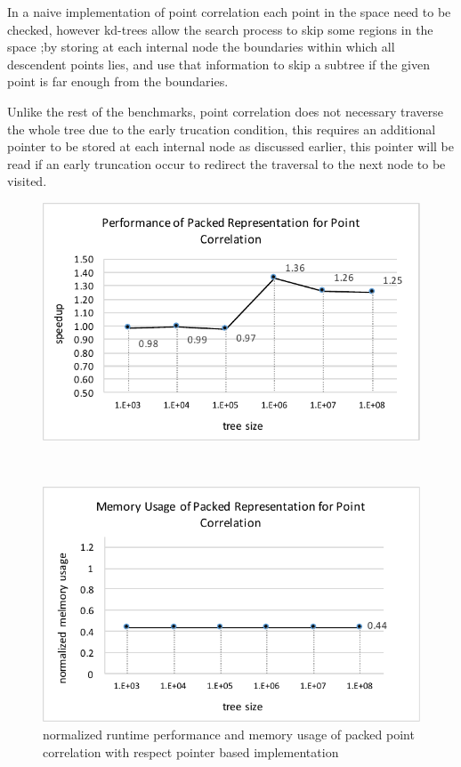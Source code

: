 \documentclass[a4paper,english]{lipics-v2016}
\begin{document}
In a naive implementation of point correlation each point in the space need to be checked, however kd-trees 
allow the search process to skip some regions in the space ;by storing at each internal node the boundaries within which all descendent points lies,
and use that information to skip a subtree if the given point is far enough from the boundaries.

Unlike the rest of the benchmarks, point correlation does not necessary traverse the whole tree due to the early trucation condition,
this requires an additional pointer to be stored at each internal node  as discussed earlier, this pointer will be read if an early truncation occur to redirect the traversal to the
next node to be visited.

  
\begin{figure}[htp]
\begin{minipage}{1.04\textwidth}
  \begin{minipage}{.49\textwidth}
    \centering
    \includegraphics[width=\textwidth]{./figs/pointCorr_perf.pdf}

  \end{minipage}
  $ $ 
  \begin{minipage}{.49\textwidth}
    \centering
    \includegraphics[width=\textwidth]{./figs/pointCorr_MemUsage.pdf}

  \end{minipage}
\end{minipage}
   \caption{normalized runtime performance and memory usage of packed point correlation with respect pointer based implementation }
         \label{fig:pointCorr}
\end{figure}
\end{document}
